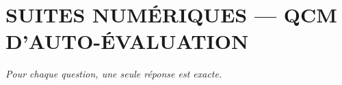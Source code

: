 
\section*{\textcolor{chapcolor}{\MakeUppercase{Suites numériques — QCM d'auto-évaluation}}}

\begin{center}
\textit{Pour chaque question, une seule réponse est exacte.}
\end{center}

